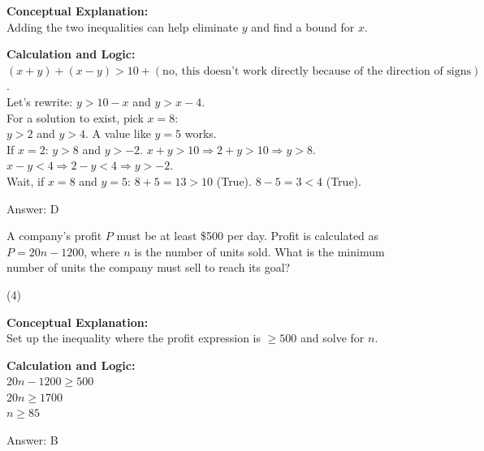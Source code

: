 \documentclass[11pt,paper=a4,answers]{exam}
\begin{document}
\begin{questions}
\begin{solution}
\textbf{Conceptual Explanation:} \\
Adding the two inequalities can help eliminate $y$ and find a bound for $x$.

\vspace{10pt}
\textbf{Calculation and Logic:} \\
$(x + y) + (x - y) > 10 + (\text{no, this doesn't work directly because of the direction of signs})$. \\
Let's rewrite: $y > 10 - x$ and $y > x - 4$. \\
For a solution to exist, pick $x = 8$: \\
$y > 2$ and $y > 4$. A value like $y = 5$ works. \\
If $x = 2$: $y > 8$ and $y > -2$. $x + y > 10 \Rightarrow 2 + y > 10 \Rightarrow y > 8$. $x - y < 4 \Rightarrow 2 - y < 4 \Rightarrow y > -2$. \\
Wait, if $x=8$ and $y=5$: $8+5=13 > 10$ (True). $8-5=3 < 4$ (True).

\vspace{15pt}
Answer: \colorbox{yellow!100}{D}
\end{solution}

\vspace{20pt}

\question
A company's profit $P$ must be at least \$500 per day. Profit is calculated as $P = 20n - 1200$, where $n$ is the number of units sold. What is the minimum number of units the company must sell to reach its goal?
\begin{tasks}(4)
\end{tasks}

\begin{solution}
\textbf{Conceptual Explanation:} \\
Set up the inequality where the profit expression is $\ge 500$ and solve for $n$.

\vspace{10pt}
\textbf{Calculation and Logic:} \\
$20n - 1200 \ge 500$ \\
$20n \ge 1700$ \\
$n \ge 85$

\vspace{15pt}
Answer: \colorbox{yellow!100}{B}
\end{solution}


\end{questions}
\end{document}

